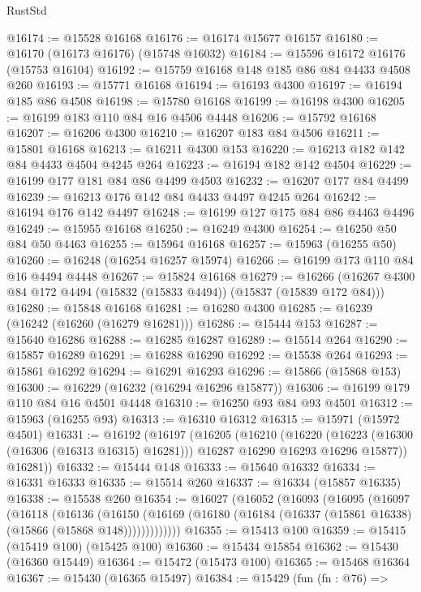 \begin{lexlean}{RustStd}
\begin{coremodule}
{\begin{coremodule}
{{{{{{{{{{{{{{{{{{{{{{{{{{{{{{{{{{{{{{{{{{{{{{{{{{{{{{{{{{{{@16174 := @15528 @16168
@16176 := @16174 @15677 @16157
@16180 := @16170 (@16173 @16176) (@15748 @16032)
@16184 := @15596 @16172 @16176 (@15753 @16104)
@16192 := @15759 @16168 @148 @185 @86 @84 @4433 @4508 @260
@16193 := @15771 @16168
@16194 := @16193 @4300
@16197 := @16194 @185 @86 @4508
@16198 := @15780 @16168
@16199 := @16198 @4300
@16205 := @16199 @183 @110 @84 @16 @4506 @4448
@16206 := @15792 @16168
@16207 := @16206 @4300
@16210 := @16207 @183 @84 @4506
@16211 := @15801 @16168
@16213 := @16211 @4300 @153
@16220 := @16213 @182 @142 @84 @4433 @4504 @4245 @264
@16223 := @16194 @182 @142 @4504
@16229 := @16199 @177 @181 @84 @86 @4499 @4503
@16232 := @16207 @177 @84 @4499
@16239 := @16213 @176 @142 @84 @4433 @4497 @4245 @264
@16242 := @16194 @176 @142 @4497
@16248 := @16199 @127 @175 @84 @86 @4463 @4496
@16249 := @15955 @16168
@16250 := @16249 @4300
@16254 := @16250 @50 @84 @50 @4463
@16255 := @15964 @16168
@16257 := @15963 (@16255 @50)
@16260 := @16248 (@16254 @16257 @15974)
@16266 := @16199 @173 @110 @84 @16 @4494 @4448
@16267 := @15824 @16168
@16279 := @16266 (@16267 @4300 @84 @172 @4494 (@15832 (@15833 @4494)) (@15837 (@15839 @172 @84)))
@16280 := @15848 @16168
@16281 := @16280 @4300
@16285 := @16239 (@16242 (@16260 (@16279 @16281)))
@16286 := @15444 @153
@16287 := @15640 @16286
@16288 := @16285 @16287
@16289 := @15514 @264
@16290 := @15857 @16289
@16291 := @16288 @16290
@16292 := @15538 @264
@16293 := @15861 @16292
@16294 := @16291 @16293
@16296 := @15866 (@15868 @153)
@16300 := @16229 (@16232 (@16294 @16296 @15877))
@16306 := @16199 @179 @110 @84 @16 @4501 @4448
@16310 := @16250 @93 @84 @93 @4501
@16312 := @15963 (@16255 @93)
@16313 := @16310 @16312
@16315 := @15971 (@15972 @4501)
@16331 := @16192
    (@16197
      (@16205
        (@16210
          (@16220
            (@16223 (@16300 (@16306 (@16313 @16315) @16281)))
            @16287
            @16290
            @16293
            @16296
            @15877))
        @16281))
@16332 := @15444 @148
@16333 := @15640 @16332
@16334 := @16331 @16333
@16335 := @15514 @260
@16337 := @16334 (@15857 @16335)
@16338 := @15538 @260
@16354 := @16027
    (@16052
      (@16093
        (@16095
          (@16097
            (@16118
              (@16136
                (@16150
                  (@16169 (@16180 (@16184 (@16337 (@15861 @16338) (@15866 (@15868 @148)))))))))))))
@16355 := @15413 @100
@16359 := @15415 (@15419 @100) (@15425 @100)
@16360 := @15434 @15854
@16362 := @15430 (@16360 @15449)
@16364 := @15472 (@15473 @100)
@16365 := @15468 @16364
@16367 := @15430 (@16365 @15497)
@16384 := @15429
    (fun (fn : @76) =>
}}}}}}}}}}}}}}}}}}}}}}}}}}}}}}}}}}}}}}}}}}}}}}}}}}}}}}}}}}}}
\end{coremodule}}
\end{coremodule}
\end{lexlean}
